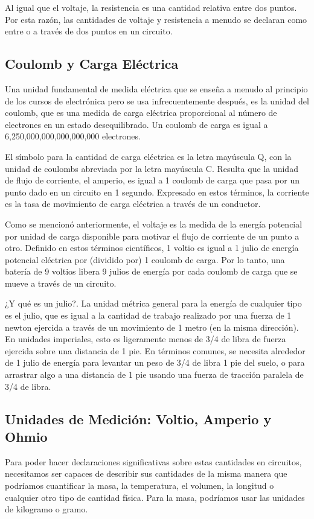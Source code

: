 \documentclass[output=paper, 
colorlinks,
citecolor=brown,
newtxmath
]{langscibook}
\begin{document}
Al igual que el voltaje, la resistencia es una cantidad relativa entre dos puntos. Por esta razón, las cantidades de voltaje y resistencia a menudo se declaran como entre o a través de dos puntos en un circuito.


\subsection{Coulomb y Carga Eléctrica}
Una unidad fundamental de medida eléctrica que se enseña a menudo al principio de los cursos de electrónica pero se usa infrecuentemente después, es la unidad del coulomb, que es una medida de carga eléctrica proporcional al número de electrones en un estado desequilibrado. Un coulomb de carga es igual a 6,250,000,000,000,000,000 electrones.

El símbolo para la cantidad de carga eléctrica es la letra mayúscula Q, con la unidad de coulombs abreviada por la letra mayúscula C. Resulta que la unidad de flujo de corriente, el amperio, es igual a 1 coulomb de carga que pasa por un punto dado en un circuito en 1 segundo. Expresado en estos términos, la corriente es la tasa de movimiento de carga eléctrica a través de un conductor.

Como se mencionó anteriormente, el voltaje es la medida de la energía potencial por unidad de carga disponible para motivar el flujo de corriente de un punto a otro.  Definido en estos términos científicos, 1 voltio es igual a 1 julio de energía potencial eléctrica por (dividido por) 1 coulomb de carga. Por lo tanto, una batería de 9 voltios libera 9 julios de energía por cada coulomb de carga que se mueve a través de un circuito.

¿Y qué es un julio?. La unidad métrica general para la energía de cualquier tipo es el julio, que es igual a la cantidad de trabajo realizado por una fuerza de 1 newton ejercida a través de un movimiento de 1 metro (en la misma dirección). En unidades imperiales, esto es ligeramente menos de 3/4 de libra de fuerza ejercida sobre una distancia de 1 pie. En términos comunes, se necesita alrededor de 1 julio de energía para levantar un peso de 3/4 de libra 1 pie del suelo, o para arrastrar algo a una distancia de 1 pie usando una fuerza de tracción paralela de 3/4 de libra. 


\subsection{Unidades de Medición: Voltio, Amperio y Ohmio}
Para poder hacer declaraciones significativas sobre estas cantidades en circuitos, necesitamos ser capaces de describir sus cantidades de la misma manera que podríamos cuantificar la masa, la temperatura, el volumen, la longitud o cualquier otro tipo de cantidad física. Para la masa, podríamos usar las unidades de kilogramo o gramo.
\end{document}
